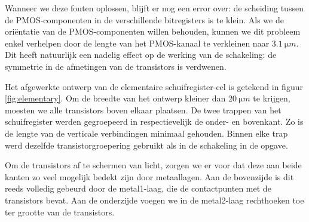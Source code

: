 \documentclass[11pt,a4paper,oneside,dutch]{article}
\begin{document}
Wanneer we deze fouten oplossen, blijft er nog een error over: de scheiding tussen de PMOS-componenten in de verschillende bitregisters is te klein. Als we de oriëntatie van de PMOS-componenten willen behouden, kunnen we dit probleem enkel verhelpen door de lengte van het PMOS-kanaal te verkleinen naar $\SI{3,1}{\micro m}$. Dit heeft natuurlijk een nadelig effect op de werking van de schakeling: de symmetrie in de afmetingen van de transistors is verdwenen.

Het afgewerkte ontwerp van de elementaire schuifregister-cel is getekend in figuur \ref{fig:elementary}. Om de breedte van het ontwerp kleiner dan $\SI{20}{\micro m}$ te krijgen, moesten we alle transistors boven elkaar plaatsen. De twee trappen van het schuifregister werden gegroepeerd in respectievelijk de onder- en bovenkant. Zo is de lengte van de verticale verbindingen minimaal gehouden. Binnen elke trap werd dezelfde transistorgroepering gebruikt als in de schakeling in de opgave.

Om de transistors af te schermen van licht, zorgen we er voor dat deze aan beide kanten zo veel mogelijk bedekt zijn door metaallagen. Aan de bovenzijde is dit reeds volledig gebeurd door de metal1-laag, die de contactpunten met de transistors bevat. Aan de onderzijde voegen we in de metal2-laag rechthoeken toe ter grootte van de transistors.
\end{document}
